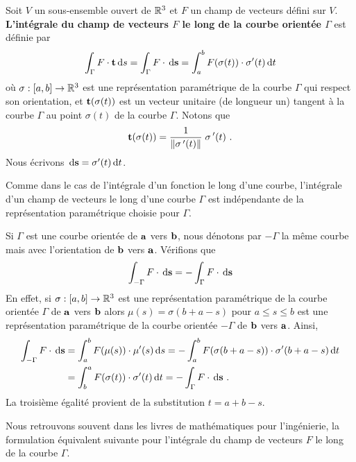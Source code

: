 {\begin{defn}
Soit $V$ un sous-ensemble ouvert de $\mathbb{R}^3$ et $F$ un champ de
vecteurs défini sur $V$.
{\bfseries L'intégrale du champ de vecteurs $F$ le long de la
courbe orientée $\Gamma$} est définie par
\begin{equation} \label{line_int_vect}
\int_\Gamma F \cdot \mathbf{t} \,\mathrm{d}s = \int_\Gamma F \cdot \,\mathrm{d}\mathbf{s}
= \int_a^b F(\sigma(t)) \cdot \sigma'(t) \,\mathrm{d}t
\end{equation}
où $\sigma:[a,b] \to \mathbb{R}^3$ est une représentation paramétrique de la
courbe $\Gamma$ qui respect son orientation, et $\mathbf{t}(\sigma(t))$ est
un vecteur unitaire (de longueur un) tangent à la courbe $\Gamma$ au
point $\sigma(t)$ de la courbe $\Gamma$.  Notons que
\[
\mathbf{t}(\sigma(t)) = \frac{1}{\|\sigma\,'(t)\|}\;\sigma\,'(t) \ .
\]
Nous écrivons $\,\mathrm{d}\mathbf{s} = \sigma'(t) \,\mathrm{d}t$.
\end{defn}

\begin{rmk}
Comme dans le cas de l'intégrale d'un fonction le long d'une courbe, 
l'intégrale d'un champ de vecteurs le long d'une courbe $\Gamma$ est
indépendante de la représentation paramétrique choisie pour $\Gamma$.
\end{rmk}

\begin{rmk}
Si $\Gamma$ est une courbe orientée de $\mathbf{a}$ vers $\mathbf{b}$, nous
dénotons par $-\Gamma$ la même courbe mais avec l'orientation de
$\mathbf{b}$ vers $\mathbf{a}$.  Vérifions que
\[
  \int_{-\Gamma} F \cdot \,\mathrm{d}\mathbf{s}
= - \int_\Gamma F \cdot \,\mathrm{d}\mathbf{s}
\]
En effet, si $\sigma:[a,b]\to \mathbb{R}^3$ est une représentation
paramétrique de la courbe orientée $\Gamma$ de $\mathbf{a}$ vers
$\mathbf{b}$ alors $\mu(s) = \sigma(b+a-s)$ pour $a \leq s \leq b$
est une représentation paramétrique de la courbe orientée $-\Gamma$ de
$\mathbf{b}$ vers $\mathbf{a}$.  Ainsi,
\begin{align*}
\int_{-\Gamma} F \cdot \,\mathrm{d}\mathbf{s} &=
\int_a^b F(\mu(s)) \cdot \mu'(s) \,\mathrm{d}s
= - \int_a^b F(\sigma(b+a -s)) \cdot \sigma'(b+a-s) \,\mathrm{d}t \\
&= \int_b^a F(\sigma(t)) \cdot \sigma'(t) \,\mathrm{d}t
= - \int_\Gamma F \cdot \,\mathrm{d}\mathbf{s} \ .
\end{align*}
La troisième égalité provient de la substitution $t = a+b-s$.
\end{rmk}

Nous retrouvons souvent dans les livres de mathématiques pour
l'ingénierie, la formulation équivalent suivante pour l'intégrale du
champ de vecteurs $F$ le long de la courbe $\Gamma$.

}
